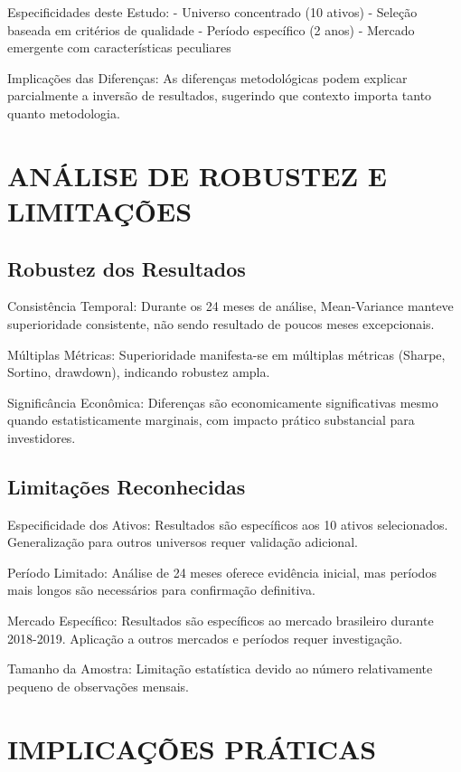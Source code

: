 Especificidades deste Estudo:
- Universo concentrado (10 ativos)
- Seleção baseada em critérios de qualidade
- Período específico (2 anos)
- Mercado emergente com características peculiares

Implicações das Diferenças: As diferenças metodológicas podem explicar parcialmente a inversão de resultados, sugerindo que contexto importa tanto quanto metodologia.

\section{ANÁLISE DE ROBUSTEZ E LIMITAÇÕES}

\subsection{Robustez dos Resultados}

Consistência Temporal: Durante os 24 meses de análise, Mean-Variance manteve superioridade consistente, não sendo resultado de poucos meses excepcionais.

Múltiplas Métricas: Superioridade manifesta-se em múltiplas métricas (Sharpe, Sortino, drawdown), indicando robustez ampla.

Significância Econômica: Diferenças são economicamente significativas mesmo quando estatisticamente marginais, com impacto prático substancial para investidores.

\subsection{Limitações Reconhecidas}

Especificidade dos Ativos: Resultados são específicos aos 10 ativos selecionados. Generalização para outros universos requer validação adicional.

Período Limitado: Análise de 24 meses oferece evidência inicial, mas períodos mais longos são necessários para confirmação definitiva.

Mercado Específico: Resultados são específicos ao mercado brasileiro durante 2018-2019. Aplicação a outros mercados e períodos requer investigação.

Tamanho da Amostra: Limitação estatística devido ao número relativamente pequeno de observações mensais.

\section{IMPLICAÇÕES PRÁTICAS}

